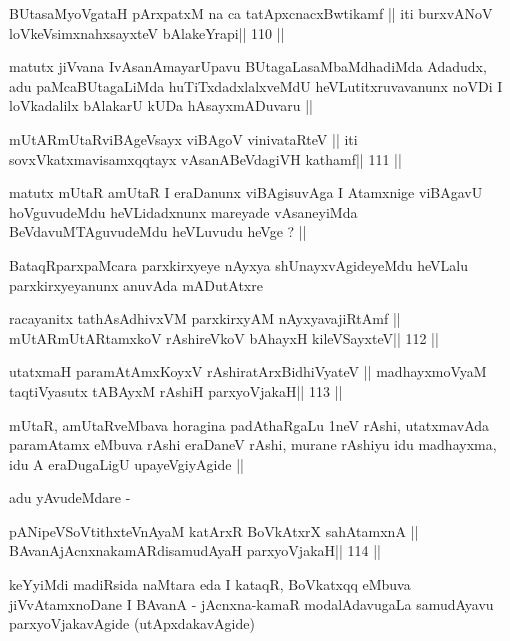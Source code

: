 \begin{shl}
BUtasaMyoVgataH pArxpatxM na ca tatApxcnacxBwtikamf ||
iti burxvANoV loVkeV\s simxnahxsayxteV bAlakeYrapi\hfill || 110 ||
\end{shl}

\begin{artha}
matutx jiVvana IvAsanAmayarUpavu BUtagaLasaMbaMdhadiMda Adadudx, adu
paMcaBUtagaLiMda huTiTxdadxlalxveMdU heVLutitxruvavanunx noVDi I
loVkadalilx bAlakarU kUDa hAsayxmADuvaru ||
\end{artha}

\begin{shl}
mUtARmUtaRviBAgeV\s sayx viBAgoV vinivataRteV ||
iti sovxVkatxmavisamxqqtayx vAsanABeVdagiVH kathamf\hfill || 111 ||
\end{shl}

\begin{artha}
matutx mUtaR amUtaR I eraDanunx viBAgisuvAga I Atamxnige viBAgavU
hoVguvudeMdu heVLidadxnunx mareyade vAsaneyiMda BeVdavuMTAguvudeMdu
heVLuvudu heVge ? ||
\end{artha}

\begin{artha}
BataqRparxpaMcara parxkirxyeye nAyxya shUnayxvAgideyeMdu heVLalu
parxkirxyeyanunx anuvAda mADutAtxre
\end{artha}

\begin{shl}
racayanitx tathA\s sAdhivxVM parxkirxyAM nAyxyavajiRtAmf ||
mUtARmUtARtamxkoV rAshireVkoV bAhayxH kileVSayxteV\hfill || 112 ||
\end{shl}

\begin{shl}
utatxmaH paramAtAmxKoyxV rAshiratArxBidhiVyateV ||
madhayxmoV\s yaM taqtiVyasutx tABAyxM rAshiH parxyoVjakaH\hfill || 113 ||
\end{shl}

\begin{artha}
mUtaR, amUtaRveMbava horagina padAthaRgaLu 1neV rAshi, utatxmavAda
paramAtamx eMbuva rAshi eraDaneV rAshi, murane rAshiyu idu madhayxma,
idu A eraDugaLigU upayeVgiyAgide ||

adu yAvudeMdare -
\end{artha}

\begin{shl}
pANipeVSoVtithxteVnAyaM katArxR BoVkAtxrX sahA\s\s tamxnA ||
BAvanAjAcnxnakamARdisamudAyaH parxyoVjakaH\hfill || 114 ||
\end{shl}

\begin{artha}
keYyiMdi madiRsida naMtara eda I kataqR, BoVkatxqq eMbuva
jiVvAtamxnoDane I BAvanA - jAcnxna-kamaR modalAdavugaLa samudAyavu
parxyoVjakavAgide (utApxdakavAgide)
\end{artha}

